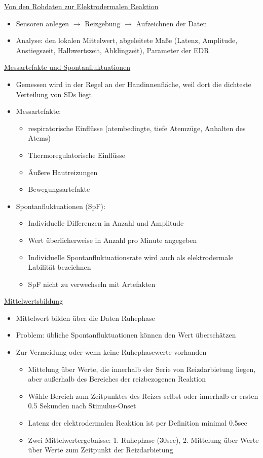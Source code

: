 \documentclass[a4paper,10pt,oneside]{article}
\begin{document}
\underline{Von den Rohdaten zur Elektrodermalen Reaktion} \\
	\begin{itemize}
		\item Sensoren anlegen $\rightarrow$ Reizgebung $\rightarrow$ Aufzeichnen der Daten
		\item Analyse: den lokalen Mittelwert, abgeleitete Maße (Latenz, Amplitude, Anstiegszeit, Halbwertszeit, Abklingzeit), Parameter der EDR
	\end{itemize}
 		
\underline{Messartefakte und Spontanfluktuationen} \\
	\begin{itemize}
		\item Gemessen wird in der Regel an der Handinnenfläche, weil dort die dichteste Verteilung von SDs liegt
		\item Messartefakte:	
			\begin{itemize}
				\item respiratorische Einflüsse (atembedingte, tiefe Atemzüge, Anhalten des Atems)
				\item Thermoregulatorische Einflüsse
				\item Äußere Hautreizungen
				\item Bewegungsartefakte
			\end{itemize}
		\item Spontanfluktuationen (SpF):
			\begin{itemize}
				\item Individuelle Differenzen in Anzahl und Amplitude
				\item Wert überlicherweise in Anzahl pro Minute angegeben 
				\item Individuelle Spontanfluktuationsrate wird auch als elektrodermale Labilität bezeichnen
				\item SpF nicht zu verwechseln mit Artefakten 
			\end{itemize}
	\end{itemize}
	
\underline{Mittelwertsbildung} \\
	\begin{itemize}
		\item Mittelwert bilden über die Daten Ruhephase
		\item Problem: übliche Spontanfluktuationen können den Wert überschätzen
		\item Zur Vermeidung oder wenn keine Ruhephasewerte vorhanden
			\begin{itemize}
				\item Mittelung über Werte, die innerhalb der Serie von Reizdarbietung liegen, aber außerhalb des Bereiches der reizbezogenen Reaktion
				\item Wähle Bereich zum Zeitpunktes des Reizes selbst oder innerhalb er ersten 0.5 Sekunden nach Stimulus-Onset
				\item Latenz der elektrodermalen Reaktion ist per Definition minimal 0.5sec 
				\item Zwei Mittelwertergebnisse: 1. Ruhephase (30sec), 2. Mittelung über Werte über Werte zum Zeitpunkt der Reizdarbietung
			\end{itemize}
	\end{itemize}
	
\end{document}
